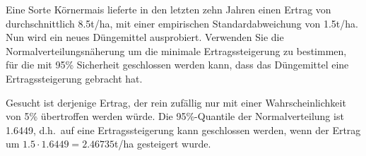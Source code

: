 Eine Sorte Körnermais lieferte in den letzten zehn Jahren
einen Ertrag von durchschnittlich
8.5t/ha, mit einer empirischen Standardabweichung von 1.5t/ha.
Nun wird ein neues Düngemittel ausprobiert.
Verwenden Sie die Normalverteilungsnäherung um die minimale
Ertragssteigerung zu bestimmen, für die mit 95\% Sicherheit geschlossen
werden kann, dass das Düngemittel eine Ertragssteigerung gebracht hat.


\begin{loesung}
Gesucht ist derjenige Ertrag, der rein zufällig nur mit einer
Wahrscheinlichkeit
von 5\% übertroffen werden würde.
Die 95\%-Quantile der
Normalverteilung ist 1.6449, d.h.~auf eine Ertragssteigerung kann
geschlossen werden, wenn der Ertrag um
$1.5\cdot 1.6449=2.46735$t/ha gesteigert wurde.
\end{loesung}

